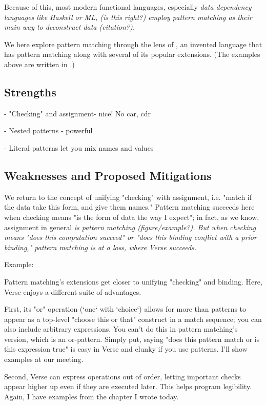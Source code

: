 \documentclass{article}
\begin{document}
Because of this, most modern functional languages, especially \it{data
dependency languages} like Haskell or ML, \it{(is this right?)} employ pattern
matching as their main way to deconstruct data (citation?). 

We here explore pattern matching through the lens of \PPlus, an invented
language that has pattern matching along with several of its popular extensions.
(The examples above are written in \PPlus.) 
\subsection{Strengths}

- "Checking" and assignment- nice! No car, cdr 

- Nested patterns - powerful 

- Literal patterns let you mix names and values 

\subsection{Weaknesses and Proposed Mitigations}

We return to the concept of unifying "checking" with assignment, i.e. "match if
the data take this form, and give them names." Pattern matching succeeds here
when checking means "is the form of data the way I expect"; in fact, as we know,
assignment in general \it{is} pattern matching (figure/example?). But when
checking means "does this computation succeed" or "does this binding conflict
with a prior binding," pattern matching is at a loss, where Verse succeeds. 

Example: 


Pattern matching's extensions get closer to unifying "checking" and binding.
Here, Verse enjoys a different suite of advantages. 

First, its "or" operation (`one` with `choice`) allows for more than patterns to
appear as a top-level "choose this or that" construct in a match sequence; you
can also include arbitrary expressions. You can't do this in pattern matching's
version, which is an or-pattern. Simply put, saying "does this pattern match or
is this expression true" is easy in Verse and clunky if you use patterns. I'll
show examples at our meeting. 

Second, Verse can express operations out of order, letting important checks
appear higher up even if they are executed later. This helps program legibility.
Again, I have examples from the chapter I wrote today. 
\end{document}
